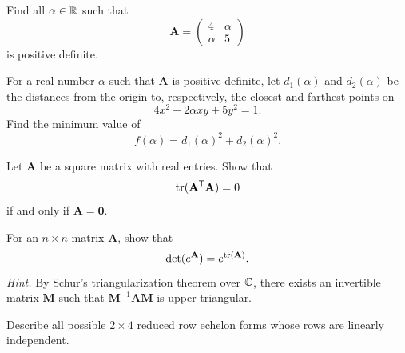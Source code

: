 \documentclass[11pt,oneside]{article}
\begin{document}
\begin{problem}
\begin{problemsubparts}
\item Find all $\alpha\in\mathbb{R}$ such that
\[
\mathbf A=
\begin{pmatrix}
4&\alpha\\
\alpha&5
\end{pmatrix}
\]
is positive definite.
\item For a real number $\alpha$ such that $\mathbf A$ is positive definite, let $d_1(\alpha)$ and $d_2(\alpha)$ be the distances from the origin to, respectively, the closest and farthest points on
\[
4x^2+2\alpha xy+5y^2=1.
\]
Find the minimum value of
\[
f(\alpha)=d_1(\alpha)^2+d_2(\alpha)^2.
\]
\end{problemsubparts}
\end{problem}

\begin{problem}
Let $\mathbf A$ be a square matrix with real entries. Show that
\[
\operatorname{tr}(\mathbf A^{\mathsf T}\mathbf A)=0
\]
if and only if $\mathbf A=\mathbf 0$.
\end{problem}

\begin{problem}
For an $n\times n$ matrix $\mathbf A$, show that
\[
\det(e^{\mathbf A})=e^{\operatorname{tr}(\mathbf A)}.
\]
\textit{Hint.} By Schur's triangularization theorem over $\mathbb{C}$, there exists an invertible matrix $\mathbf M$ such that $\mathbf M^{-1}\mathbf A\mathbf M$ is upper triangular.
\end{problem}

\schoolsection{\KAIST}{\KoreaAdvancedInstituteOfScienceAndTechnology}

\begin{problem}
Describe all possible $2\times4$ reduced row echelon forms whose rows are linearly independent.
\end{problem}
\end{document}
